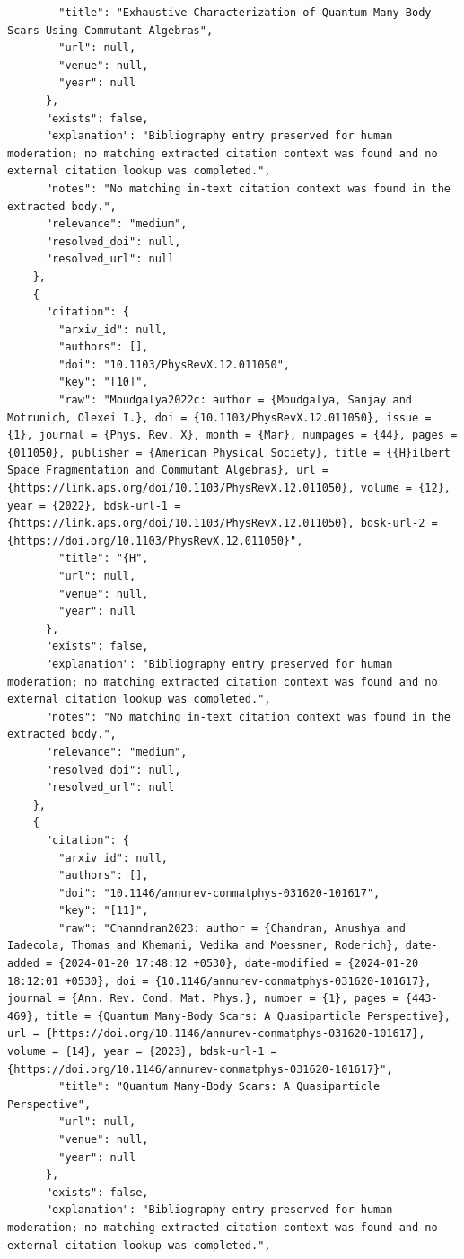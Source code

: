 \documentclass[11pt]{article}
\begin{document}
\begin{verbatim}
        "title": "Exhaustive Characterization of Quantum Many-Body Scars Using Commutant Algebras",
        "url": null,
        "venue": null,
        "year": null
      },
      "exists": false,
      "explanation": "Bibliography entry preserved for human moderation; no matching extracted citation context was found and no external citation lookup was completed.",
      "notes": "No matching in-text citation context was found in the extracted body.",
      "relevance": "medium",
      "resolved_doi": null,
      "resolved_url": null
    },
    {
      "citation": {
        "arxiv_id": null,
        "authors": [],
        "doi": "10.1103/PhysRevX.12.011050",
        "key": "[10]",
        "raw": "Moudgalya2022c: author = {Moudgalya, Sanjay and Motrunich, Olexei I.}, doi = {10.1103/PhysRevX.12.011050}, issue = {1}, journal = {Phys. Rev. X}, month = {Mar}, numpages = {44}, pages = {011050}, publisher = {American Physical Society}, title = {{H}ilbert Space Fragmentation and Commutant Algebras}, url = {https://link.aps.org/doi/10.1103/PhysRevX.12.011050}, volume = {12}, year = {2022}, bdsk-url-1 = {https://link.aps.org/doi/10.1103/PhysRevX.12.011050}, bdsk-url-2 = {https://doi.org/10.1103/PhysRevX.12.011050}",
        "title": "{H",
        "url": null,
        "venue": null,
        "year": null
      },
      "exists": false,
      "explanation": "Bibliography entry preserved for human moderation; no matching extracted citation context was found and no external citation lookup was completed.",
      "notes": "No matching in-text citation context was found in the extracted body.",
      "relevance": "medium",
      "resolved_doi": null,
      "resolved_url": null
    },
    {
      "citation": {
        "arxiv_id": null,
        "authors": [],
        "doi": "10.1146/annurev-conmatphys-031620-101617",
        "key": "[11]",
        "raw": "Channdran2023: author = {Chandran, Anushya and Iadecola, Thomas and Khemani, Vedika and Moessner, Roderich}, date-added = {2024-01-20 17:48:12 +0530}, date-modified = {2024-01-20 18:12:01 +0530}, doi = {10.1146/annurev-conmatphys-031620-101617}, journal = {Ann. Rev. Cond. Mat. Phys.}, number = {1}, pages = {443-469}, title = {Quantum Many-Body Scars: A Quasiparticle Perspective}, url = {https://doi.org/10.1146/annurev-conmatphys-031620-101617}, volume = {14}, year = {2023}, bdsk-url-1 = {https://doi.org/10.1146/annurev-conmatphys-031620-101617}",
        "title": "Quantum Many-Body Scars: A Quasiparticle Perspective",
        "url": null,
        "venue": null,
        "year": null
      },
      "exists": false,
      "explanation": "Bibliography entry preserved for human moderation; no matching extracted citation context was found and no external citation lookup was completed.",

\end{verbatim}
\end{document}
